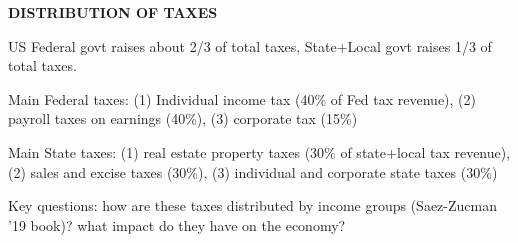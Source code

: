 \documentclass[landscape]{slides}
\begin{document}
\begin{slide}

\end{slide}


\begin{slide}

\end{slide}


%
%
%
%

%

\begin{slide}
\begin{center}
{\bf DISTRIBUTION OF TAXES}
\end{center}


US Federal govt raises about 2/3 of total taxes, State+Local govt raises 1/3 of total taxes.

Main Federal taxes: (1) Individual income tax (40\% of Fed tax revenue), (2) payroll taxes on earnings (40\%), (3) corporate tax
(15\%)

Main State taxes: (1) real estate property taxes (30\% of state+local tax revenue), (2) sales and excise taxes (30\%), (3) individual and corporate state taxes (30\%)

Key questions: how are these taxes distributed by income groups (Saez-Zucman '19 book)? what impact do they have on the economy?

\end{slide}
\end{document}
